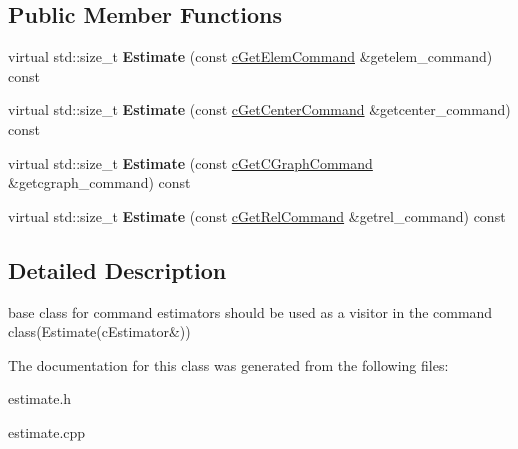 \subsection*{Public Member Functions}
\begin{DoxyCompactItemize}
\item 
\hypertarget{classengine_1_1cEstimator_a6d2c3458e2ce412c10a355d651d9b98f}{virtual std\-::size\-\_\-t {\bfseries Estimate} (const \hyperlink{classengine_1_1cGetElemCommand}{c\-Get\-Elem\-Command} \&getelem\-\_\-command) const }\label{classengine_1_1cEstimator_a6d2c3458e2ce412c10a355d651d9b98f}

\item 
\hypertarget{classengine_1_1cEstimator_af6bcdcbb321c9d700571cf6fa1c06925}{virtual std\-::size\-\_\-t {\bfseries Estimate} (const \hyperlink{classengine_1_1cGetCenterCommand}{c\-Get\-Center\-Command} \&getcenter\-\_\-command) const }\label{classengine_1_1cEstimator_af6bcdcbb321c9d700571cf6fa1c06925}

\item 
\hypertarget{classengine_1_1cEstimator_add065c4c480b539c47b53195d6426764}{virtual std\-::size\-\_\-t {\bfseries Estimate} (const \hyperlink{classengine_1_1cGetCGraphCommand}{c\-Get\-C\-Graph\-Command} \&getcgraph\-\_\-command) const }\label{classengine_1_1cEstimator_add065c4c480b539c47b53195d6426764}

\item 
\hypertarget{classengine_1_1cEstimator_a8b24ad32a6c43c3230c2326e78659717}{virtual std\-::size\-\_\-t {\bfseries Estimate} (const \hyperlink{classengine_1_1cGetRelCommand}{c\-Get\-Rel\-Command} \&getrel\-\_\-command) const }\label{classengine_1_1cEstimator_a8b24ad32a6c43c3230c2326e78659717}

\end{DoxyCompactItemize}


\subsection{Detailed Description}
base class for command estimators should be used as a visitor in the command class(\-Estimate(c\-Estimator\&)) 

The documentation for this class was generated from the following files\-:\begin{DoxyCompactItemize}
\item 
estimate.\-h\item 
estimate.\-cpp\end{DoxyCompactItemize}
